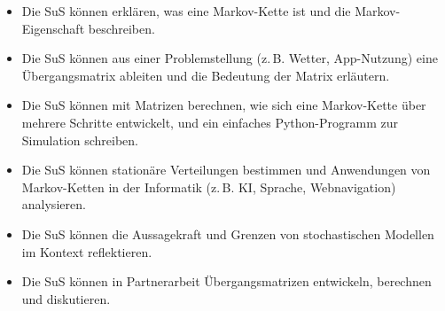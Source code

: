 \begin{itemize}
    \item[\textbf{Wissen}] Die SuS können erklären, was eine Markov-Kette ist und die Markov-Eigenschaft beschreiben.
    \item[\textbf{Verstehen}] Die SuS können aus einer Problemstellung (z.\,B. Wetter, App-Nutzung) eine Übergangsmatrix ableiten und die Bedeutung der Matrix erläutern.
    \item[\textbf{Anwenden}] Die SuS können mit Matrizen berechnen, wie sich eine Markov-Kette über mehrere Schritte entwickelt, und ein einfaches Python-Programm zur Simulation schreiben.
    \item[\textbf{Analysieren}] Die SuS können stationäre Verteilungen bestimmen und Anwendungen von Markov-Ketten in der Informatik (z.\,B. KI, Sprache, Webnavigation) analysieren.
    \item[\textbf{Bewerten}] Die SuS können die Aussagekraft und Grenzen von stochastischen Modellen im Kontext reflektieren.
    \item[\textbf{Entwickeln}] Die SuS können in Partnerarbeit Übergangsmatrizen entwickeln, berechnen und diskutieren.
\end{itemize}


